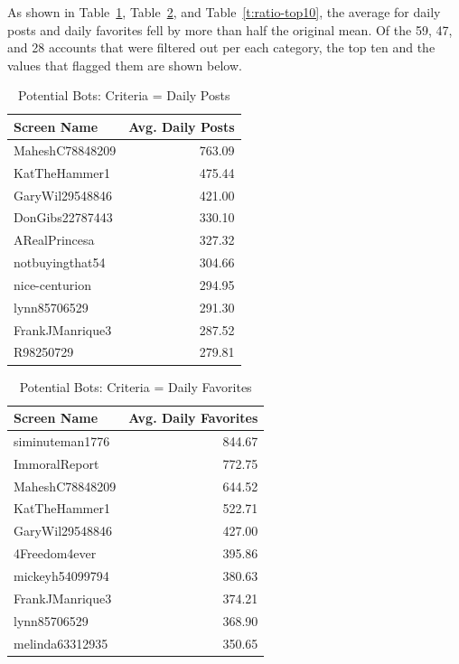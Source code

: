 As shown in Table~\ref{t:post-top10}, Table~\ref{t:faves-top10}, and
Table~\ref{t:ratio-top10}, the average for daily posts and daily favorites fell
by more than half the original mean. Of the 59, 47, and 28 accounts that were
filtered out per each category, the top ten and the values that flagged them
are shown below.

\begin{table}[htb]
\centering
\caption{Potential Bots: Criteria = Daily Posts}
\label{t:post-top10}
\begin{tabular}{lr}
Screen Name & Avg. Daily Posts \\
\toprule
MaheshC78848209 & 763.09  \\
KatTheHammer1   & 475.44  \\
GaryWil29548846 & 421.00  \\
DonGibs22787443 & 330.10  \\
ARealPrincesa   & 327.32  \\
notbuyingthat54 & 304.66  \\
nice-centurion  & 294.95  \\
lynn85706529    & 291.30  \\
FrankJManrique3 & 287.52  \\
R98250729       & 279.81  
\end{tabular}
\end{table}

\begin{table}[htb]
\centering
\caption{Potential Bots: Criteria = Daily Favorites}
\label{t:faves-top10}
\begin{tabular}{lr}
Screen Name & Avg. Daily Favorites \\
\toprule
siminuteman1776 & 844.67 \\
ImmoralReport   & 772.75 \\
MaheshC78848209 & 644.52 \\
KatTheHammer1   & 522.71 \\
GaryWil29548846 & 427.00 \\
4Freedom4ever   & 395.86 \\
mickeyh54099794 & 380.63 \\
FrankJManrique3 & 374.21 \\
lynn85706529    & 368.90 \\
melinda63312935 & 350.65  
\end{tabular}
\end{table}


